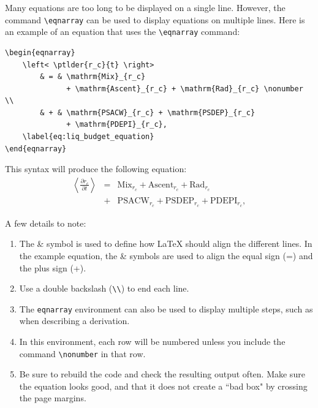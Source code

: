 \documentclass[master]{UWMThesis}
\newcommand{\ptlder}[2]{\frac{\partial #1}{\partial #2}}
\begin{document}
Many equations are too long to be displayed on a single line.  However, the command \verb=\eqnarray= can be used to display equations on multiple lines.  Here is an example of an equation that uses the \verb=\eqnarray= command:

\pagebreak

\begin{verbatim}
\begin{eqnarray}
	\left< \ptlder{r_c}{t} \right> 
	    & = & \mathrm{Mix}_{r_c}
	          + \mathrm{Ascent}_{r_c} + \mathrm{Rad}_{r_c} \nonumber \\
	    & + & \mathrm{PSACW}_{r_c} + \mathrm{PSDEP}_{r_c}
	          + \mathrm{PDEPI}_{r_c},
	\label{eq:liq_budget_equation}
\end{eqnarray}
\end{verbatim}

This syntax will produce the following equation:
\begin{eqnarray}
	\left< \ptlder{r_c}{t} \right> & = & \mathrm{Mix}_{r_c} + \mathrm{Ascent}_{r_c} + \mathrm{Rad}_{r_c} \nonumber \\
	                               & + & \mathrm{PSACW}_{r_c} + \mathrm{PSDEP}_{r_c} + \mathrm{PDEPI}_{r_c},
	\label{eq:liq_budget_equation}
\end{eqnarray}

A few details to note:

\begin{enumerate}
\item The \& symbol is used to define how LaTeX should align the different lines.  In the example equation, the \& symbols are used to align the equal sign (=) and the plus sign (+).

\item Use a double backslash (\verb=\\=) to end each line.

\item The \verb=eqnarray= environment can also be used to display multiple steps, such as when describing a derivation.

\item In this environment, each row will be numbered unless you include the command  \verb=\nonumber= in that row.

\item Be sure to rebuild the code and check the resulting output often.  Make sure the equation looks good, and that it does not create a ``bad box" by crossing the page margins.

\end{enumerate}
\end{document}
